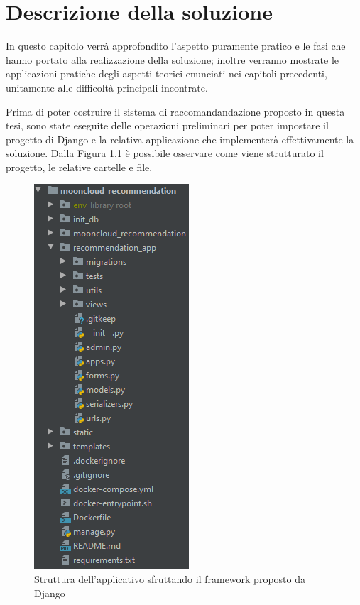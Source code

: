 \chapter{Descrizione della soluzione}
\label{chp:04-solution}
In questo capitolo verrà approfondito l'aspetto puramente pratico e le fasi che hanno portato alla realizzazione della soluzione; 
inoltre verranno mostrate le applicazioni pratiche degli aspetti teorici enunciati nei capitoli precedenti, unitamente alle difficoltà 
principali incontrate.


Prima di poter costruire il sistema di raccomandandazione proposto in questa tesi, sono state eseguite delle operazioni preliminari
per poter impostare il progetto di Django e la relativa applicazione che implementerà effettivamente la soluzione.
Dalla Figura \ref{fig:str_django_project} è possibile osservare come viene strutturato il progetto, le relative cartelle e file.\\

\begin{figure}
	\centering
	\includegraphics[scale=0.7]{images/str_django_project.png}
	\caption{Struttura dell'applicativo sfruttando il framework proposto da Django}
	\label{fig:str_django_project}
\end{figure}

